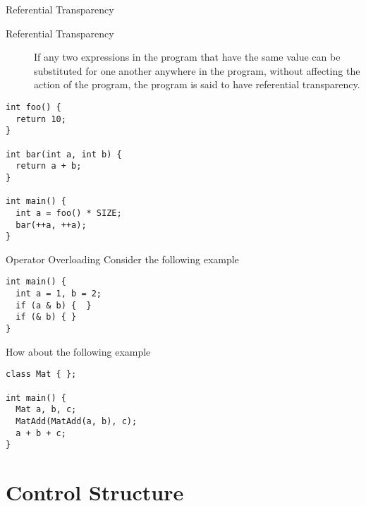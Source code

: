 \documentclass[presentation]{beamer}
\begin{document}
\begin{frame}[fragile,label={sec:orgheadline16}]{Referential Transparency}
 \begin{description}
\item[{Referential Transparency}] If any two expressions in the program
that have the same value can be substituted for one another
anywhere in the program, without affecting the action of the
program, the program is said to have referential transparency.
\end{description}


\begin{verbatim}
int foo() {
  return 10;
}

int bar(int a, int b) {
  return a + b;
}

int main() {
  int a = foo() * SIZE;
  bar(++a, ++a);
}
\end{verbatim}
\end{frame}

\begin{frame}[fragile,label={sec:orgheadline17}]{Operator Overloading}
 Consider the following example

\begin{verbatim}
int main() {
  int a = 1, b = 2;
  if (a & b) {  }
  if (& b) { }
}
\end{verbatim}

How about the following example

\begin{verbatim}
class Mat { };

int main() {
  Mat a, b, c;
  MatAdd(MatAdd(a, b), c);
  a + b + c;
}
\end{verbatim}
\end{frame}

\section{Control Structure}
\label{sec:orgheadline19}
\end{document}
